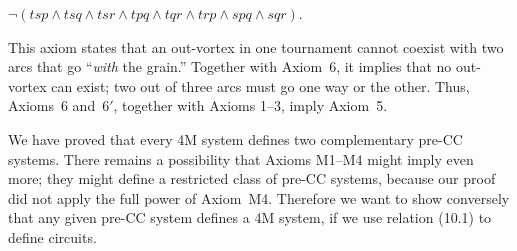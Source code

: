 \quad
$\neg(tsp\wedge tsq\wedge tsr\wedge tpq\wedge tqr\wedge trp\wedge
spq\wedge sqr)$.

\bn
This axiom states that an out-vortex in one tournament cannot coexist
with two arcs that go ``{\it with\/} the grain.'' Together with
Axiom~6, it implies that no out-vortex can exist; two out of three
arcs must go one way or the other. Thus, Axioms~6 and~$6'$, together
with Axioms 1--3, imply Axiom~5.

We have proved that every 4M system defines two complementary pre-CC
systems. There remains a possibility that Axioms M1--M4 might imply
even more; they might define a restricted class of pre-CC systems,
because our proof did not apply the full power of Axiom~M4. Therefore
we want to show conversely that any given pre-CC system defines a 4M
system, if we use relation (10.1) to define circuits.




